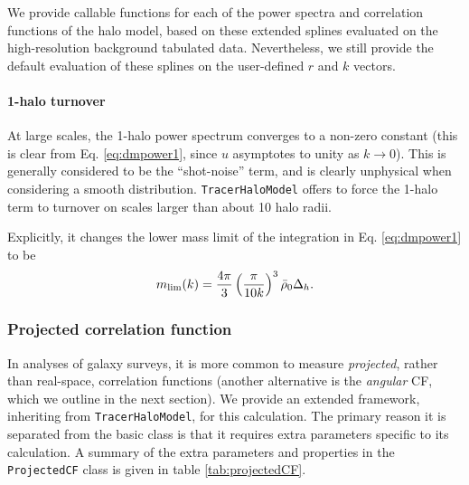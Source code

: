 \documentclass[5p]{elsarticle}
\begin{document}
We provide callable functions for each of the power spectra and correlation functions of the halo model, based on these extended splines evaluated on the high-resolution background tabulated data. 
Nevertheless, we still provide the default evaluation of these splines on the user-defined $r$ and $k$ vectors. 


\paragraph*{1-halo turnover}
At large scales, the 1-halo power spectrum converges to a non-zero constant (this is clear from Eq. \ref{eq:dmpower1}, since $u$ asymptotes to unity as $k\rightarrow0$). This is generally considered to be the ``shot-noise'' term, and is clearly unphysical when considering a smooth distribution. 
\verb|TracerHaloModel| offers to force the 1-halo term to turnover on scales larger than about 10 halo radii. 

Explicitly, it changes the lower mass limit of the integration in Eq. \ref{eq:dmpower1} to be
\begin{equation}
    m_{\rm lim}(k) = \frac{4\pi}{3} \left(\frac{\pi}{10k}\right)^3 \bar{\rho}_0 \Delta_h.
\end{equation}

\subsubsection{Projected correlation function}
\label{sec:projcorr}
In analyses of galaxy surveys, it is more common to measure \textit{projected}, rather than real-space, correlation functions (another alternative is the \textit{angular} CF, which we outline in the next section).
We provide an extended framework, inheriting from \verb|TracerHaloModel|, for this calculation. The primary reason it is separated from the basic class is that it requires extra parameters specific to its calculation. A summary of the extra parameters and properties in the \verb|ProjectedCF| class is given in table \ref{tab:projectedCF}. 

\end{document}
